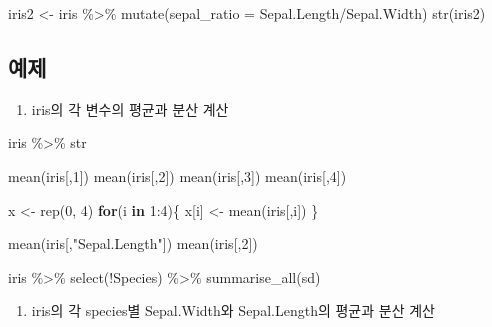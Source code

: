 \documentclass[
]{book}
\newenvironment{Shaded}{\begin{snugshade}}{\end{snugshade}}
\newcommand{\AttributeTok}[1]{\textcolor[rgb]{0.77,0.63,0.00}{#1}}
\newcommand{\ControlFlowTok}[1]{\textcolor[rgb]{0.13,0.29,0.53}{\textbf{#1}}}
\newcommand{\DecValTok}[1]{\textcolor[rgb]{0.00,0.00,0.81}{#1}}
\newcommand{\FunctionTok}[1]{\textcolor[rgb]{0.00,0.00,0.00}{#1}}
\newcommand{\NormalTok}[1]{#1}
\newcommand{\OtherTok}[1]{\textcolor[rgb]{0.56,0.35,0.01}{#1}}
\newcommand{\SpecialCharTok}[1]{\textcolor[rgb]{0.00,0.00,0.00}{#1}}
\newcommand{\StringTok}[1]{\textcolor[rgb]{0.31,0.60,0.02}{#1}}
\providecommand{\tightlist}{%
  \setlength{\itemsep}{0pt}\setlength{\parskip}{0pt}}
\begin{document}
\begin{Shaded}
\begin{Highlighting}[]
\NormalTok{iris2 }\OtherTok{\textless{}{-}}\NormalTok{ iris }\SpecialCharTok{\%\textgreater{}\%} 
  \FunctionTok{mutate}\NormalTok{(}\AttributeTok{sepal\_ratio =}\NormalTok{ Sepal.Length}\SpecialCharTok{/}\NormalTok{Sepal.Width)}
\FunctionTok{str}\NormalTok{(iris2)}
\end{Highlighting}
\end{Shaded}

\hypertarget{uxc608uxc81c}{%
\subsection{예제}\label{uxc608uxc81c}}

\begin{enumerate}
\def\labelenumi{\arabic{enumi}.}
\tightlist
\item
  iris의 각 변수의 평균과 분산 계산
\end{enumerate}

\begin{Shaded}
\begin{Highlighting}[]
\NormalTok{iris }\SpecialCharTok{\%\textgreater{}\%}\NormalTok{ str}

\FunctionTok{mean}\NormalTok{(iris[,}\DecValTok{1}\NormalTok{])}
\FunctionTok{mean}\NormalTok{(iris[,}\DecValTok{2}\NormalTok{])}
\FunctionTok{mean}\NormalTok{(iris[,}\DecValTok{3}\NormalTok{])}
\FunctionTok{mean}\NormalTok{(iris[,}\DecValTok{4}\NormalTok{])}

\NormalTok{x }\OtherTok{\textless{}{-}} \FunctionTok{rep}\NormalTok{(}\DecValTok{0}\NormalTok{, }\DecValTok{4}\NormalTok{)}
\ControlFlowTok{for}\NormalTok{(i }\ControlFlowTok{in} \DecValTok{1}\SpecialCharTok{:}\DecValTok{4}\NormalTok{)\{}
\NormalTok{  x[i] }\OtherTok{\textless{}{-}} \FunctionTok{mean}\NormalTok{(iris[,i])}
\NormalTok{\}}


\FunctionTok{mean}\NormalTok{(iris[,}\StringTok{"Sepal.Length"}\NormalTok{])}
\FunctionTok{mean}\NormalTok{(iris[,}\DecValTok{2}\NormalTok{])}

\NormalTok{iris }\SpecialCharTok{\%\textgreater{}\%} 
  \FunctionTok{select}\NormalTok{(}\SpecialCharTok{!}\NormalTok{Species) }\SpecialCharTok{\%\textgreater{}\%} 
  \FunctionTok{summarise\_all}\NormalTok{(sd)}
\end{Highlighting}
\end{Shaded}

\begin{enumerate}
\def\labelenumi{\arabic{enumi}.}
\setcounter{enumi}{1}
\tightlist
\item
  iris의 각 species별 Sepal.Width와 Sepal.Length의 평균과 분산 계산
\end{enumerate}
\end{document}
